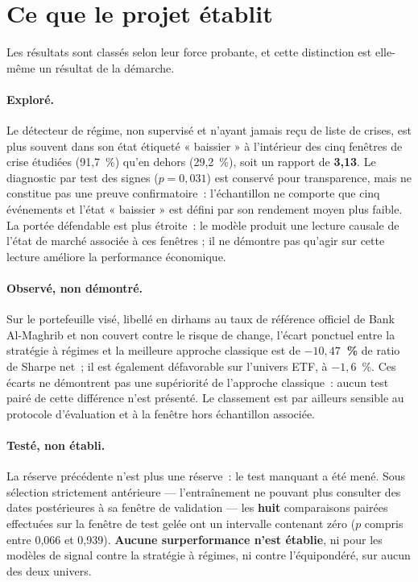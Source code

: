 \section*{Ce que le projet établit}

Les résultats sont classés selon leur force probante, et cette distinction est
elle-même un résultat de la démarche.

\paragraph{Exploré.} Le détecteur de régime, non supervisé et n'ayant jamais
reçu de liste de crises, est plus souvent dans son état étiqueté « baissier » à
l'intérieur des cinq fenêtres de crise étudiées (91,7~\%) qu'en dehors (29,2~\%),
soit un rapport de \textbf{3,13}. Le diagnostic par test des signes ($p = 0{,}031$)
est conservé pour transparence, mais ne constitue pas une preuve confirmatoire~:
l'échantillon ne comporte que cinq événements et l'état « baissier » est défini
par son rendement moyen plus faible. La portée défendable est plus étroite~: le
modèle produit une lecture causale de l'état de marché associée à ces fenêtres ;
il ne démontre pas qu'agir sur cette lecture améliore la performance économique.

\paragraph{Observé, non démontré.} Sur le portefeuille visé, libellé en dirhams
au taux de référence officiel de Bank Al-Maghrib et non couvert contre le risque
de change, l'écart ponctuel entre la stratégie à régimes et la meilleure approche
classique est de \textbf{$-10{,}47$~\%} de ratio de Sharpe net~; il est également
défavorable sur l'univers ETF, à $-1{,}6$~\%. Ces écarts ne démontrent pas une
supériorité de l'approche classique~: aucun test pairé de cette différence n'est
présenté. Le classement est par ailleurs sensible au protocole d'évaluation et à
la fenêtre hors échantillon associée.

\paragraph{Testé, non établi.} La réserve précédente n'est plus une réserve~: le
test manquant a été mené. Sous sélection strictement antérieure — l'entraînement
ne pouvant plus consulter des dates postérieures à sa fenêtre de validation — les
\textbf{huit} comparaisons pairées effectuées sur la fenêtre de test gelée ont un
intervalle contenant zéro ($p$ compris entre 0,066 et 0,939). \textbf{Aucune
surperformance n'est établie}, ni pour les modèles de signal contre la stratégie à
régimes, ni contre l'équipondéré, sur aucun des deux univers.

